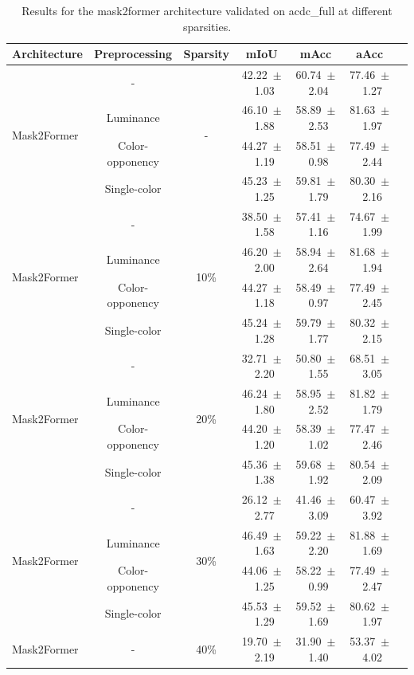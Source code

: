 \begin{table}[h]
\centering
\caption{Results for the mask2former architecture validated on acdc_full at different sparsities.}
\begin{tabular}{@{}lccc ccc@{}}
\toprule
Architecture & Preprocessing & Sparsity & mIoU & mAcc & aAcc \\
\midrule

\multirow{4}{*}{Mask2Former} & - & \multirow{4}{*}{-} & 42.22~$\pm$~1.03 & 60.74~$\pm$~2.04 & 77.46~$\pm$~1.27 \\
& Luminance & & 46.10~$\pm$~1.88 & 58.89~$\pm$~2.53 & 81.63~$\pm$~1.97 \\
& Color-opponency & & 44.27~$\pm$~1.19 & 58.51~$\pm$~0.98 & 77.49~$\pm$~2.44 \\
& Single-color & & 45.23~$\pm$~1.25 & 59.81~$\pm$~1.79 & 80.30~$\pm$~2.16 \\
\midrule
\multirow{4}{*}{Mask2Former} & - & \multirow{4}{*}{10\%} & 38.50~$\pm$~1.58 & 57.41~$\pm$~1.16 & 74.67~$\pm$~1.99 \\
& Luminance & & 46.20~$\pm$~2.00 & 58.94~$\pm$~2.64 & 81.68~$\pm$~1.94 \\
& Color-opponency & & 44.27~$\pm$~1.18 & 58.49~$\pm$~0.97 & 77.49~$\pm$~2.45 \\
& Single-color & & 45.24~$\pm$~1.28 & 59.79~$\pm$~1.77 & 80.32~$\pm$~2.15 \\
\midrule
\multirow{4}{*}{Mask2Former} & - & \multirow{4}{*}{20\%} & 32.71~$\pm$~2.20 & 50.80~$\pm$~1.55 & 68.51~$\pm$~3.05 \\
& Luminance & & 46.24~$\pm$~1.80 & 58.95~$\pm$~2.52 & 81.82~$\pm$~1.79 \\
& Color-opponency & & 44.20~$\pm$~1.20 & 58.39~$\pm$~1.02 & 77.47~$\pm$~2.46 \\
& Single-color & & 45.36~$\pm$~1.38 & 59.68~$\pm$~1.92 & 80.54~$\pm$~2.09 \\
\midrule
\multirow{4}{*}{Mask2Former} & - & \multirow{4}{*}{30\%} & 26.12~$\pm$~2.77 & 41.46~$\pm$~3.09 & 60.47~$\pm$~3.92 \\
& Luminance & & 46.49~$\pm$~1.63 & 59.22~$\pm$~2.20 & 81.88~$\pm$~1.69 \\
& Color-opponency & & 44.06~$\pm$~1.25 & 58.22~$\pm$~0.99 & 77.49~$\pm$~2.47 \\
& Single-color & & 45.53~$\pm$~1.29 & 59.52~$\pm$~1.69 & 80.62~$\pm$~1.97 \\
\midrule
\multirow{4}{*}{Mask2Former} & - & \multirow{4}{*}{40\%} & 19.70~$\pm$~2.19 & 31.90~$\pm$~1.40 & 53.37~$\pm$~4.02 \\

\end{tabular}
\end{table}
